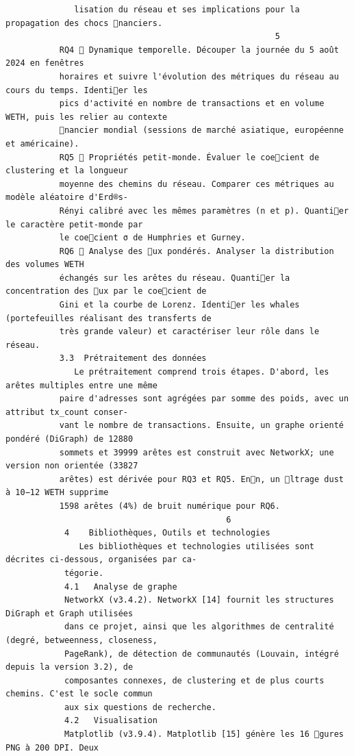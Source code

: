 \documentclass[12pt]{article}
\begin{document}
\begin{verbatim}
              lisation du réseau et ses implications pour la propagation des chocs nanciers.
                                                       5
           RQ4  Dynamique temporelle. Découper la journée du 5 août 2024 en fenêtres
           horaires et suivre l'évolution des métriques du réseau au cours du temps. Identier les
           pics d'activité en nombre de transactions et en volume WETH, puis les relier au contexte
           nancier mondial (sessions de marché asiatique, européenne et américaine).
           RQ5  Propriétés petit-monde. Évaluer le coecient de clustering et la longueur
           moyenne des chemins du réseau. Comparer ces métriques au modèle aléatoire d'Erd®s-
           Rényi calibré avec les mêmes paramètres (n et p). Quantier le caractère petit-monde par
           le coecient σ de Humphries et Gurney.
           RQ6  Analyse des ux pondérés. Analyser la distribution des volumes WETH
           échangés sur les arêtes du réseau. Quantier la concentration des ux par le coecient de
           Gini et la courbe de Lorenz. Identier les whales (portefeuilles réalisant des transferts de
           très grande valeur) et caractériser leur rôle dans le réseau.
           3.3  Prétraitement des données
              Le prétraitement comprend trois étapes. D'abord, les arêtes multiples entre une même
           paire d'adresses sont agrégées par somme des poids, avec un attribut tx_count conser-
           vant le nombre de transactions. Ensuite, un graphe orienté pondéré (DiGraph) de 12880
           sommets et 39999 arêtes est construit avec NetworkX; une version non orientée (33827
           arêtes) est dérivée pour RQ3 et RQ5. Enn, un ltrage dust à 10−12 WETH supprime
           1598 arêtes (4%) de bruit numérique pour RQ6.
                                             6
            4    Bibliothèques, Outils et technologies
               Les bibliothèques et technologies utilisées sont décrites ci-dessous, organisées par ca-
            tégorie.
            4.1   Analyse de graphe
            NetworkX (v3.4.2). NetworkX [14] fournit les structures DiGraph et Graph utilisées
            dans ce projet, ainsi que les algorithmes de centralité (degré, betweenness, closeness,
            PageRank), de détection de communautés (Louvain, intégré depuis la version 3.2), de
            composantes connexes, de clustering et de plus courts chemins. C'est le socle commun
            aux six questions de recherche.
            4.2   Visualisation
            Matplotlib (v3.9.4). Matplotlib [15] génère les 16 gures PNG à 200 DPI. Deux

\end{verbatim}
\end{document}
